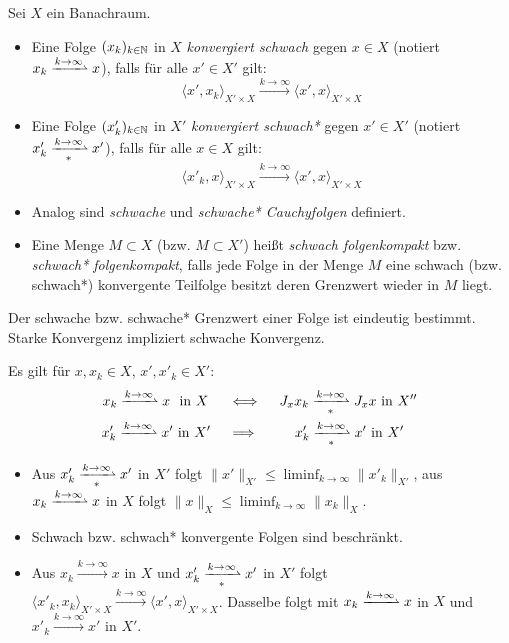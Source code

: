 \documentclass{cheat-sheet}
\newcommand{\convWith}[1]{\xrightarrow{#1 \to \infty}} %
\newcommand{\convWeaklyWith}[1]{\xrightharpoonup{#1 \to \infty}} %
\newcommand{\convWeaklyStarWith}[1]{\xrightharpoonup[*]{#1 \to \infty}} %
\begin{document}
\begin{defn}
  Sei $X$ ein Banachraum.
  \begin{itemize}
    \item Eine Folge $(x_k)_{k \in \mathbb{N}}$ in $X$ \emph{konvergiert schwach} gegen $x \in X$ (notiert $x_k \convWeaklyWith{k} x$), falls für alle $x' \in X'$ gilt:
    \[ \langle x', x_k \rangle_{X' \times X} \convWith{k} \langle x', x \rangle_{X' \times X} \]
    \item Eine Folge $(x'_k)_{k \in \mathbb{N}}$ in $X'$ \emph{konvergiert schwach*} gegen $x' \in X'$ (notiert $x'_k \convWeaklyStarWith{k} x'$), falls für alle $x \in X$ gilt:
    \[ \langle x'_k, x \rangle_{X' \times X} \convWith{k} \langle x', x \rangle_{X' \times X} \]
    \item Analog sind \emph{schwache} und \emph{schwache* Cauchyfolgen} definiert.
    \item Eine Menge $M \subset X$ (bzw. $M \subset X'$) heißt \emph{schwach folgenkompakt} bzw. \emph{schwach* folgenkompakt}, falls jede Folge in der Menge $M$ eine schwach (bzw. schwach*) konvergente Teilfolge besitzt deren Grenzwert wieder in $M$ liegt.
  \end{itemize}
\end{defn}

\begin{bem}
  Der schwache bzw. schwache* Grenzwert einer Folge ist eindeutig bestimmt. Starke Konvergenz impliziert schwache Konvergenz.
\end{bem}

\begin{satz}
  Es gilt für $x, x_k \in X$, $x', x'_k \in X'$:
  \begin{align*}
    x_k \convWeaklyWith{k} x \,\, \text{ in } X \, \quad &\iff \quad J_x x_k \convWeaklyStarWith{k} J_x x \text{ in } X'' \\
    x'_k \convWeaklyWith{k} x' \text{ in } X' \quad &\implies \qquad \,\, x'_k \convWeaklyStarWith{k} x' \text{ in } X'
  \end{align*}
\end{satz}

\begin{lem}
  \begin{itemize}
    \item Aus $x'_k \convWeaklyStarWith{k} x'$ in $X'$ folgt $\|x'\|_{X'} \leq \liminf_{k \to \infty} \|x'_k\|_{X'}$, aus $x_k \convWeaklyWith{k} x$ in $X$ folgt $\|x\|_X \leq \liminf_{k \to \infty} \|x_k\|_X$.
    \item Schwach bzw. schwach* konvergente Folgen sind beschränkt.
    \item Aus $x_k \convWith{k} x$ in $X$ und $x'_k \convWeaklyStarWith{k} x'$ in $X'$ folgt $\langle x'_k, x_k \rangle_{X' \times X} \convWith{k} \langle x', x \rangle_{X' \times X}$. Dasselbe folgt mit $x_k \convWeaklyWith{k} x$ in $X$ und $x'_k \convWith{k} x'$ in $X'$.
  \end{itemize}
\end{lem}
\end{document}
